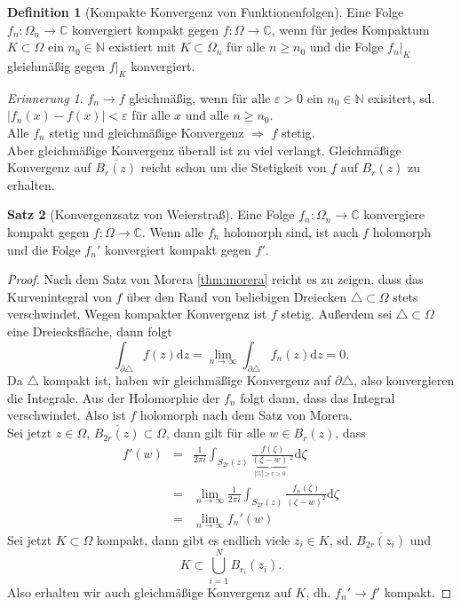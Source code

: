 \documentclass[11pt,titlepage]{article}
\theoremstyle{definition}
\newtheorem{theorem}{Satz}[section]
\newtheorem{definition}[theorem]{Definition}
\theoremstyle{remark}
\newtheorem*{remind}{Erinnerung}
\begin{document}
	\begin{definition}[Kompakte Konvergenz von Funktionenfolgen]
		Eine Folge $f_n:\Omega_n\to\mathbb{C}$ konvergiert kompakt gegen $f:\Omega\to\mathbb{C}$, wenn für 
		jedes Kompaktum $K\subset\Omega$ ein $n_0\in\mathbb{N}$ existiert mit $K\subset\Omega_n$ für alle 
		$n\geq n_0$ und die Folge $f_n|_K$ gleichmäßig gegen $f|_K$ konvergiert.
	\end{definition}
	
	\begin{remind}
		$f_n\to f$ gleichmäßig, wenn für alle $\varepsilon>0$ ein $n_0\in\mathbb{N}$ exisitert, sd. 
		$|f_n(x)-f(x)|<\varepsilon$ für alle $x$ und alle $n\geq n_0$. \\
		Alle $f_n$ stetig und gleichmäßige Konvergenz $\Rightarrow$ $f$ stetig. \\
		Aber gleichmäßige Konvergenz überall ist zu viel verlangt. Gleichmäßige Konvergenz auf $\overline{B_r(z)}$ 
		reicht schon um die Stetigkeit von $f$ auf $B_r(z)$ zu erhalten.
	\end{remind}
	
	\begin{theorem}[Konvergenzsatz von Weierstraß] \label{thm:Weierstr}
		Eine Folge $f_n:\Omega_n\to\mathbb{C}$ konvergiere kompakt gegen $f:\Omega\to\mathbb{C}$. Wenn alle 
		$f_n$ holomorph sind, ist auch $f$ holomorph und die Folge $f_n'$ konvergiert kompakt gegen $f'$.
	\end{theorem}
	
	\begin{proof}
		Nach dem Satz von Morera \ref{thm:morera} reicht es zu zeigen, dass das Kurvenintegral von $f$ über den 
		Rand von beliebigen Dreiecken $\triangle\subset\Omega$ stets verschwindet. Wegen kompakter 
		Konvergenz ist $f$ stetig. Außerdem sei $\triangle\subset\Omega$ eine Dreiecksfläche, dann folgt
		\[ \int_{\partial\triangle}f(z)\mathrm{d}z =\lim_{n\to\infty} \int_{\partial\triangle} f_n(z)\mathrm{d}z=0. \]
		Da $\triangle$ kompakt ist, haben wir gleichmäßige Konvergenz auf $\partial\triangle$, also konvergieren 
		die Integrale. Aus der Holomorphie der $f_n$ folgt dann, dass das Integral verschwindet. 
		Also ist $f$ holomorph nach dem Satz von Morera. \\
		Sei jetzt $z\in\Omega$, $\overline{B_{2r}(z)}\subset\Omega$, dann gilt für alle $w\in B_r(z)$, dass
		\begin{eqnarray*}
			f'(w)&=&\frac{1}{2\pi i} \int_{S_{2r}(z)} 
			\frac{f(\zeta)}{\underbrace{(\zeta -w)}_{|\%|\geq r>0}\ ^2}\mathrm{d}\zeta \\
			&=& \lim_{n\to\infty}\frac{1}{2\pi i} \int_{S_{2r}(z)}\frac{f_n(\zeta)}{(\zeta-w)^2}\mathrm{d}\zeta \\
			&=& \lim_{n\to\infty} f_n'(w)
		\end{eqnarray*}
		Sei jetzt $K\subset\Omega$ kompakt, dann gibt es endlich viele $z_i\in K$, sd. $\overline{B_{2r}(z_i)}$ und
		\[ K\subset \bigcup_{i=1}^N B_{r_i}(z_i) .\]
		Also erhalten wir auch gleichmäßige Konvergenz auf $K$, dh. $f_n'\to f'$ kompakt.
	\end{proof}
	
\end{document}
